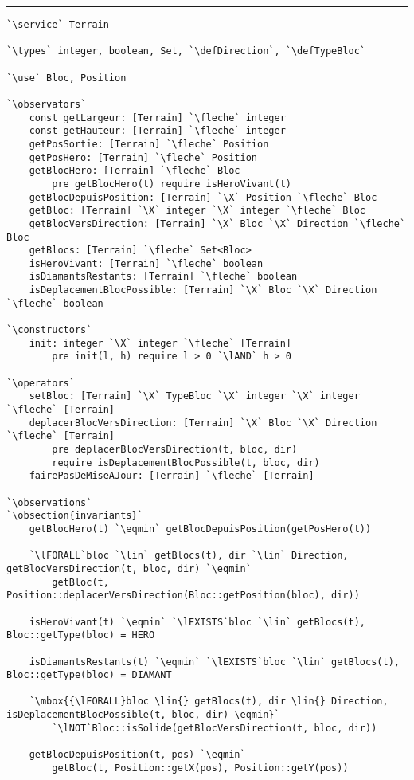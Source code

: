 \documentclass{article}
\newcommand{\fleche}{$\rightarrow{}$}
\newcommand{\X}{$\times{}$}
\newcommand{\eqmin}{$\overset{min}{=}$}
\newcommand{\lAND}{$\land$}
\newcommand{\lNOT}{$\lnot$}
\newcommand{\lFORALL}{$\forall$}
\newcommand{\lEXISTS}{$\exists$}
\newcommand{\lin}{$\in$}
\newcommand{\specsec}[1]{\Large{\textbf{#1:}}}
\newcommand{\service}{\specsec {Service}}
\newcommand{\types}{\specsec {Types}}
\newcommand{\use}{\specsec {Use}}
\newcommand{\observators}{\specsec {Observators}}
\newcommand{\constructors}{\specsec {Constructors}}
\newcommand{\operators}{\specsec {Operators}}
\newcommand{\observations}{\specsec {Observations}}
\newcommand{\obsection}[1]{\textbf{[#1]}}
\newcommand{\TypeBloc}{TypeBloc}
\newcommand{\defTypeBloc}{\mbox{enum \TypeBloc}~\{~VIDE, TERRE, MUR, HERO, SORTIE\_FERMEE, SORTIE\_OUVERTE, ROCHER, DIAMANT~\}}
\newcommand{\Direction}{Direction}
\newcommand{\defDirection}{\mbox{enum \Direction}~\{~HAUT, BAS, GAUCHE, DROITE~\}}
\begin{document}
\hrule
\clearpage{}

\begin{lstlisting}[caption=Service Terrain]
`\service` Terrain

`\types` integer, boolean, Set, `\defDirection`, `\defTypeBloc`

`\use` Bloc, Position

`\observators`
	const getLargeur: [Terrain] `\fleche` integer
	const getHauteur: [Terrain] `\fleche` integer
	getPosSortie: [Terrain] `\fleche` Position
	getPosHero: [Terrain] `\fleche` Position
	getBlocHero: [Terrain] `\fleche` Bloc
		pre getBlocHero(t) require isHeroVivant(t)
	getBlocDepuisPosition: [Terrain] `\X` Position `\fleche` Bloc
	getBloc: [Terrain] `\X` integer `\X` integer `\fleche` Bloc
	getBlocVersDirection: [Terrain] `\X` Bloc `\X` Direction `\fleche` Bloc
	getBlocs: [Terrain] `\fleche` Set<Bloc>
	isHeroVivant: [Terrain] `\fleche` boolean
	isDiamantsRestants: [Terrain] `\fleche` boolean
	isDeplacementBlocPossible: [Terrain] `\X` Bloc `\X` Direction `\fleche` boolean
	
`\constructors`
	init: integer `\X` integer `\fleche` [Terrain]
		pre init(l, h) require l > 0 `\lAND` h > 0
	
`\operators`
	setBloc: [Terrain] `\X` TypeBloc `\X` integer `\X` integer `\fleche` [Terrain]
	deplacerBlocVersDirection: [Terrain] `\X` Bloc `\X` Direction `\fleche` [Terrain]
		pre deplacerBlocVersDirection(t, bloc, dir)
		require isDeplacementBlocPossible(t, bloc, dir)
	fairePasDeMiseAJour: [Terrain] `\fleche` [Terrain]
	
`\observations`
`\obsection{invariants}`
	getBlocHero(t) `\eqmin` getBlocDepuisPosition(getPosHero(t))
	
	`\lFORALL`bloc `\lin` getBlocs(t), dir `\lin` Direction, getBlocVersDirection(t, bloc, dir) `\eqmin`
		getBloc(t, Position::deplacerVersDirection(Bloc::getPosition(bloc), dir))
		
	isHeroVivant(t) `\eqmin` `\lEXISTS`bloc `\lin` getBlocs(t), Bloc::getType(bloc) = HERO
	
	isDiamantsRestants(t) `\eqmin` `\lEXISTS`bloc `\lin` getBlocs(t), Bloc::getType(bloc) = DIAMANT
	
	`\mbox{{\lFORALL}bloc \lin{} getBlocs(t), dir \lin{} Direction, isDeplacementBlocPossible(t, bloc, dir) \eqmin}`
		`\lNOT`Bloc::isSolide(getBlocVersDirection(t, bloc, dir))
	
	getBlocDepuisPosition(t, pos) `\eqmin`
		getBloc(t, Position::getX(pos), Position::getY(pos))
	

\end{lstlisting}
\end{document}
